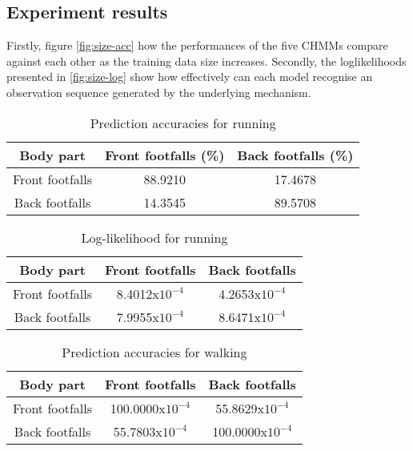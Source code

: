 \subsection{Experiment results}
Firstly, figure \ref{fig:size-acc} how the performances of the five CHMMs compare against each other as the training data size increases.
Secondly, the loglikelihoods presented in \ref{fig:size-log} show how effectively can each model recognise an observation sequence generated by the underlying mechanism.

\begin{table}[h!] 
	\centering
	\begin{tabular}{ |c|c|c|} 	
		\hline	
		\textbf{Body part} & \textbf{Front footfalls (\%)} &  \textbf{Back footfalls (\%)}\\ 
		\hline
		Front footfalls & 88.9210 & 17.4678\\ 
		\hline
		Back footfalls & 14.3545 & 89.5708 \\ 
		\hline	   	
	\end{tabular}
	\caption{Prediction accuracies for running}
	\label{tab:front-back-run-acc}
\end{table}

\begin{table}[h!] 
	\centering
	\begin{tabular}{ |c|c|c|} 	
		\hline	
		\textbf{Body part} & \textbf{Front footfalls} &  \textbf{Back footfalls}\\ 
		\hline
		Front footfalls &  8.4012x\(10^{-4}\) & 4.2653x\(10^{-4}\)\\ 
		\hline
		Back footfalls & 7.9955x\(10^{-4}\) & 8.6471x\(10^{-4}\) \\ 
		\hline	   	
	\end{tabular}
	\caption{Log-likelihood for running}
	\label{tab:front-back-run-log}
\end{table}


\begin{table}[h!] 
	\centering
	\begin{tabular}{ |c|c|c|} 	
		\hline	
		\textbf{Body part} & \textbf{Front footfalls} &  \textbf{Back footfalls}\\ 
		\hline
		Front footfalls &  100.0000x\(10^{-4}\) & 55.8629x\(10^{-4}\)\\ 
		\hline
		Back footfalls & 55.7803x\(10^{-4}\) & 100.0000x\(10^{-4}\) \\ 
		\hline	   	
	\end{tabular}
	\caption{Prediction accuracies for walking}
	\label{tab:front-back-walk-acc}
\end{table}

